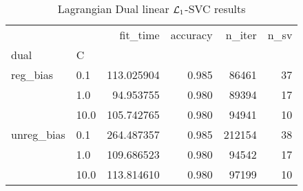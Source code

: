 \begin{table}[H]
\centering
\caption{Lagrangian Dual linear $\protect \mathcal{L}_1$-SVC results}
\label{linear_lagrangian_dual_l1_svc_cv_results}
\begin{tabular}{llrrrr}
\toprule
           &      &    fit\_time &  accuracy &  n\_iter &  n\_sv \\
dual & C &             &           &         &       \\
\midrule
reg\_bias & 0.1  &  113.025904 &     0.985 &   86461 &    37 \\
           & 1.0  &   94.953755 &     0.980 &   89394 &    17 \\
           & 10.0 &  105.742765 &     0.980 &   94941 &    10 \\
unreg\_bias & 0.1  &  264.487357 &     0.985 &  212154 &    38 \\
           & 1.0  &  109.686523 &     0.980 &   94542 &    17 \\
           & 10.0 &  113.814610 &     0.980 &   97199 &    10 \\
\bottomrule
\end{tabular}
\end{table}
